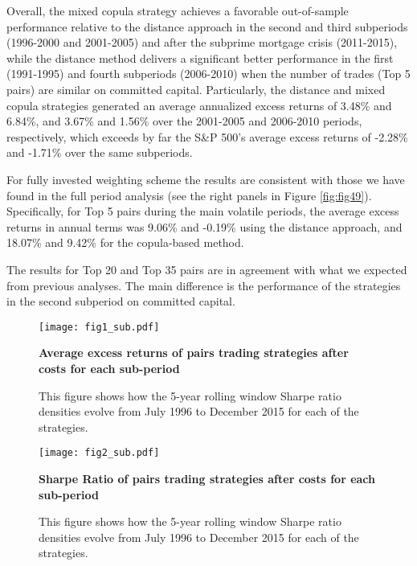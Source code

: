 \documentclass[a4paper]{article}
\begin{document}
Overall, the mixed copula strategy achieves a favorable out-of-sample performance relative to the distance approach in the second and third subperiods (1996-2000 and 2001-2005) and after the subprime mortgage crisis (2011-2015), while the distance method delivers a significant better performance in the first (1991-1995) and fourth subperiods (2006-2010) when the number of trades (Top 5 pairs) are similar on committed capital. Particularly, the distance and mixed copula strategies generated an average annualized excess returns of 3.48\% and 6.84\%, and 3.67\% and 1.56\% over the 2001-2005 and 2006-2010 periods, respectively, which exceeds by far the S\&P 500's average excess returns of -2.28\% and -1.71\% over the same subperiods.

For fully invested weighting scheme the results are consistent with those we have found in the full period analysis (see the right panels in Figure \ref{fig:fig49}). Specifically, for Top 5 pairs during the main volatile periods, the average excess returns in annual terms was 9.06\% and -0.19\% using the distance approach, and 18.07\% and 9.42\% for the copula-based method.

The results for Top 20 and Top 35 pairs are in agreement with what we expected from previous analyses. The main difference is the performance of the strategies in the second subperiod on committed capital.

\begin{figure}[H]
	\centering
		\texttt{[image: fig1\_sub.pdf]}
	\captionsetup{justification=raggedright,
		singlelinecheck=false
	}
	\caption{\textbf{Average excess returns of pairs trading strategies after costs for each sub-period}}
	\caption*{\scriptsize This figure shows how the 5-year rolling window Sharpe ratio densities evolve from July 1996 to December 2015 for each of the strategies.}
	\label{fig:fig6}
\end{figure}

\begin{figure}[H]
	\centering
		\texttt{[image: fig2\_sub.pdf]}
	\captionsetup{justification=raggedright,
		singlelinecheck=false
	}
	\caption{\textbf{Sharpe Ratio of pairs trading strategies after costs for each sub-period}}
	\caption*{\scriptsize This figure shows how the 5-year rolling window Sharpe ratio densities evolve from July 1996 to December 2015 for each of the strategies.}
	\label{fig:fig7}
\end{figure}

\vspace{1.0cm}
\end{document}
